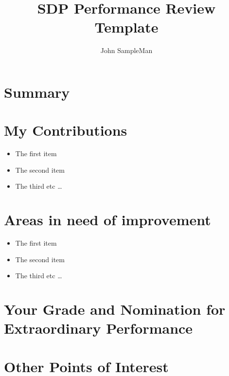 \documentclass[11pt,a4paper]{article}
\begin{document}
\title{SDP Performance Review Template}
\author{John SampleMan}
\maketitle

\section{Summary}

\section{My Contributions}

\begin{itemize}
  \item The first item
  \item The second item
  \item The third etc \ldots
\end{itemize}

\section{Areas in need of improvement}

\begin{itemize}
  \item The first item
  \item The second item
  \item The third etc \ldots
\end{itemize}

\section{Your Grade and Nomination for Extraordinary Performance}

\section{Other Points of Interest}
\end{document}
